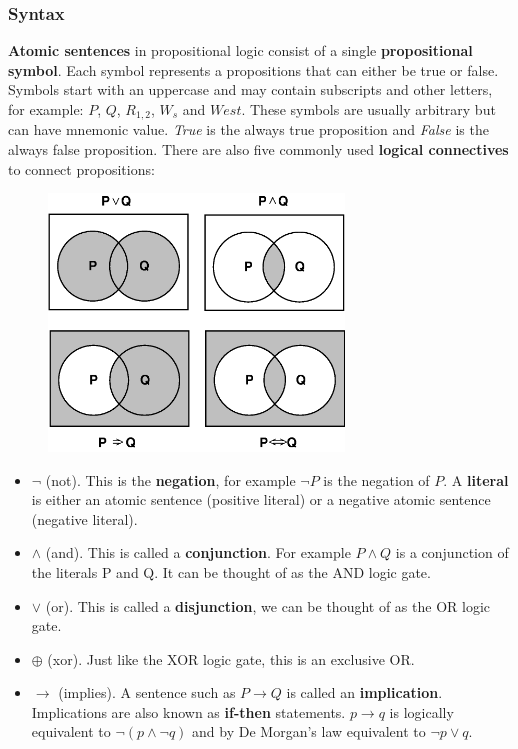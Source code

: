 \documentclass{article}
\begin{document}
\subsubsection{Syntax}
\textbf{Atomic sentences} in propositional logic consist of a single \textbf{propositional symbol}. Each symbol represents a propositions that can either be true or false. Symbols start with an uppercase and may contain subscripts and other letters, for example: $P$, $Q$, $R_{1,2}$, $W_{s}$ and $West$. These symbols are usually arbitrary but can have mnemonic value. \textit{True} is the always true proposition and \textit{False} is the always false proposition. There are also five commonly used \textbf{logical connectives} to connect propositions:
\begin{figure}[H]
\centering
\includegraphics[width=0.7\textwidth, keepaspectratio]{imgs/propositional-symbols.png}
\end{figure}
\begin{itemize}[label={}]
\item $\neg$ (not). This is the \textbf{negation}, for example $\neg P$ is the negation of $P$. A \textbf{literal} is either an atomic sentence (positive literal) or a negative atomic sentence (negative literal). 
\item $\wedge$ (and). This is called a \textbf{conjunction}. For example $P \wedge Q$ is a conjunction of the literals P and Q. It can be thought of as the AND logic gate.
\item $\vee$ (or). This is called a \textbf{disjunction}, we can be thought of as the OR logic gate.
\item $\oplus$ (xor). Just like the XOR logic gate, this is an exclusive OR. 
\item $\rightarrow$ (implies). A sentence such as $P \rightarrow Q$ is called an \textbf{implication}. Implications are also known as \textbf{if-then} statements. $p \rightarrow q$ is logically equivalent to $\neg (p \wedge \neg q)$ and by De Morgan's law equivalent to $\neg p \vee q$. 
\end{itemize}
\end{document}
